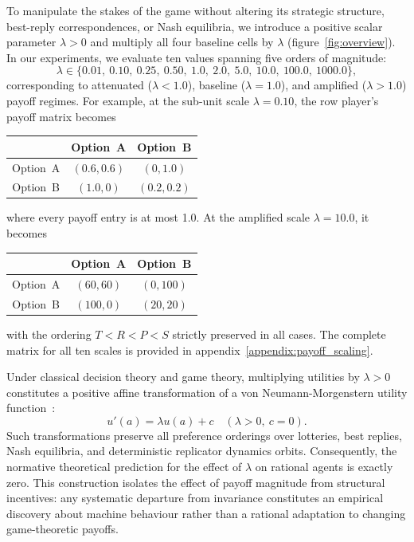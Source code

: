 \documentclass[11pt,a4paper]{article}
\newcommand{\lam}{\lambda}
\begin{document}
To manipulate the stakes of the game without altering its strategic structure,
best-reply correspondences, or Nash equilibria, we introduce a positive scalar
parameter $\lam > 0$ and multiply all four baseline cells by $\lam$
(figure~\ref{fig:overview}). In our experiments, we evaluate ten values spanning
five orders of magnitude:
\[
\lam \in \{0.01,\ 0.10,\ 0.25,\ 0.50,\ 1.0,\ 2.0,\ 5.0,\ 10.0,\ 100.0,\ 1000.0\},
\]
corresponding to attenuated ($\lam < 1.0$), baseline ($\lam = 1.0$), and
amplified ($\lam > 1.0$) payoff regimes. For example, at the sub-unit scale
$\lam = 0.10$, the row player's payoff matrix becomes
\begin{center}
\small
\begin{tabular}{c|cc}
 & Option~A & Option~B \\
\hline
Option~A & $(0.6, 0.6)$ & $(0, 1.0)$ \\
Option~B & $(1.0, 0)$ & $(0.2, 0.2)$
\end{tabular}
\end{center}
where every  payoff entry is at most 1.0. At the amplified scale $\lam = 10.0$,
it becomes
\begin{center}
\small
\begin{tabular}{c|cc}
 & Option~A & Option~B \\
\hline
Option~A & $(60, 60)$ & $(0, 100)$ \\
Option~B & $(100, 0)$ & $(20, 20)$
\end{tabular}
\end{center}
with the ordering $T < R < P < S$ strictly preserved in all cases. The complete
matrix for all ten scales is provided in appendix~\ref{appendix:payoff_scaling}.

Under classical decision theory and game theory, multiplying utilities by
$\lam > 0$ constitutes a positive affine transformation of a
von Neumann-Morgenstern utility function~\cite{von2007theory,luce1957games}:
\[
u'(a) = \lam u(a) + c \quad (\lam > 0,\ c = 0).
\]
Such transformations preserve all preference orderings over lotteries, best
replies, Nash equilibria, and deterministic replicator dynamics orbits.
Consequently, the normative theoretical prediction for the effect of $\lam$ on
rational agents is exactly zero. This construction isolates the effect of payoff
magnitude from structural incentives: any systematic departure from invariance
constitutes an empirical discovery about machine behaviour rather than a
rational adaptation to changing game-theoretic payoffs.
\end{document}
